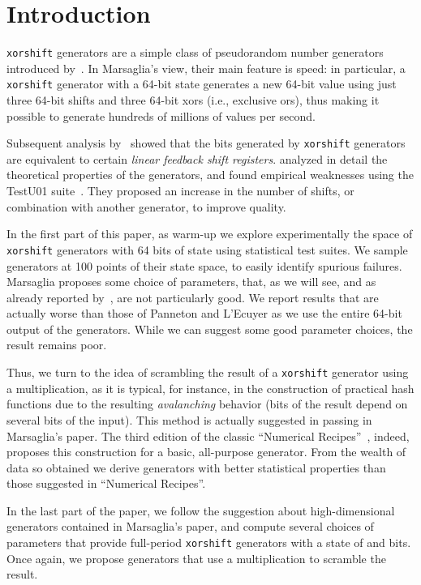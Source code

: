 \documentclass{acmsmalltr}
\newcommand{\xorshift}[1][]{\texttt{xorshift#1}\xspace}
\begin{document}
\section{Introduction}

\xorshift generators are a simple class of pseudorandom number generators
introduced by~. In Marsaglia's view, their main feature is
speed: in particular, a \xorshift generator with a 64-bit state
generates a new 64-bit value using just three 64-bit shifts and three 64-bit xors (i.e., exclusive ors), thus
making it possible to generate hundreds of millions of values per
second.

Subsequent analysis by~ showed that the bits generated by
\xorshift generators are equivalent to certain \emph{linear feedback shift registers}.
 analyzed in detail the theoretical properties of the generators,
and found empirical weaknesses using the TestU01 suite~\cite{LESTU01}. They
proposed an increase in the number of shifts, or combination with another generator, to improve quality.

In the first part of this paper, as warm-up we explore experimentally 
the space of \xorshift generators with 64 bits of state using statistical test suites. We sample
generators at 100 points of their state space, to easily identify spurious failures.
Marsaglia proposes some choice of parameters, that, as we
will see, and as already reported by~, are not particularly good.
We report results that are actually worse than those of Panneton and L'Ecuyer as
we use the entire 64-bit output of the generators.
While we can suggest some good parameter choices, the result remains poor.

Thus, we turn to the idea of scrambling the result of a \xorshift generator
using a multiplication, as it is typical, for instance, in the construction of
practical hash functions due to the resulting \emph{avalanching} behavior (bits
of the result depend on several bits of the input). This method 
is actually suggested in passing in Marsaglia's paper.
The third edition of the classic ``Numerical Recipes''~\cite{PTVNR}, indeed,
proposes this construction for a basic, all-purpose generator.
From the wealth of data so obtained we derive generators with 
better statistical properties than those suggested in ``Numerical Recipes''.

In the last part of the paper, we follow the suggestion about high-dimensional
generators contained in Marsaglia's paper, and compute 
several choices of parameters that provide full-period \xorshift generators with a state of 
and  bits. Once again, we propose generators that use a multiplication
to scramble the result.
\end{document}
